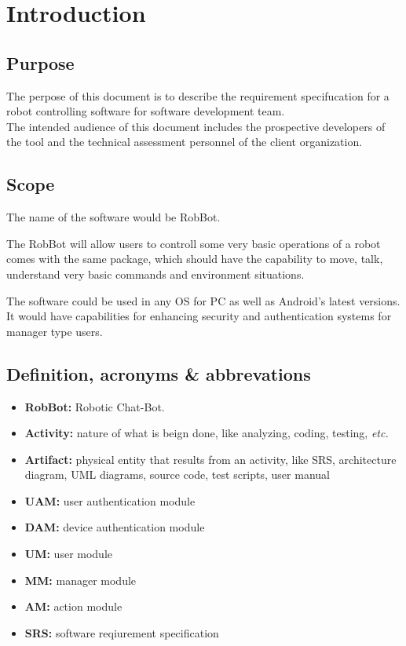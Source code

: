 \chapter{Introduction}

\section{Purpose}
The perpose of this document is to describe the requirement specifucation for a robot controlling software for software development team.
\\The intended audience of this document includes the prospective developers of the tool and the technical assessment personnel of the client organization.

\section{Scope}
The name of the software would be RobBot.
\par The RobBot will allow users to controll some very basic operations of a robot comes with the same package, which should have the capability to move, talk, understand very basic commands and environment situations.
\par The software could be used in any OS for PC as well as Android's latest versions. It would have capabilities for enhancing security and authentication systems for manager type users.

\section{Definition, acronyms \& abbrevations}
\begin{itemize}
	\item \textbf{RobBot:} Robotic Chat-Bot.
	\item \textbf{Activity:} nature of what is beign done, like analyzing, coding, testing, \textit{etc.}
	\item \textbf{Artifact:} physical entity that results from an activity, like SRS, architecture diagram, UML diagrams, source code, test scripts, user manual
	\item \textbf{UAM:} user authentication module
	\item \textbf{DAM:} device authentication module
	\item \textbf{UM:} user module
	\item \textbf{MM:} manager module
	\item \textbf{AM:} action module
	\item \textbf{SRS:} software reqiurement specification
\end{itemize}

